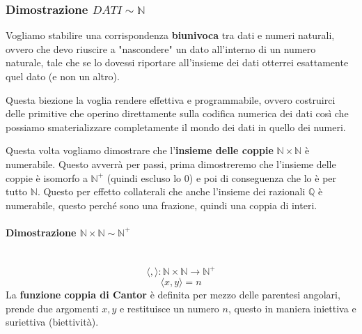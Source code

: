 \documentclass{article}
\begin{document}
\subsubsection{Dimostrazione $DATI\sim\mathbb{N}$}
Vogliamo stabilire una corrispondenza \textbf{biunivoca} tra dati e numeri naturali, ovvero
che devo riuscire a "nascondere" un dato all'interno di un numero naturale, tale che
se lo dovessi riportare all'insieme dei dati otterrei esattamente quel dato (e non un altro).

Questa biezione la voglia rendere effettiva e programmabile, ovvero costruirci delle primitive che
operino direttamente sulla codifica numerica dei dati così che possiamo smaterializzare completamente
il mondo dei dati in quello dei numeri.

Questa volta vogliamo dimostrare che l'\textbf{insieme delle coppie} $\mathbb{N}\times\mathbb{N}$
è numerabile. Questo avverrà per passi, prima dimostreremo che l'insieme delle coppie è isomorfo a
$\mathbb{N}^+$ (quindi escluso lo $0$) e poi di conseguenza che lo è per tutto $\mathbb{N}$.
Questo per effetto collaterali che anche l'insieme dei razionali $\mathbb{Q}$ è numerabile,
questo perché sono una frazione, quindi una coppia di interi.
\paragraph{Dimostrazione $\mathbb{N}\times\mathbb{N}\sim\mathbb{N}^+$}\mbox{}\\
$$\langle ,\rangle :\mathbb{N}\times\mathbb{N}\rightarrow\mathbb{N}^+$$
$$\langle x,y\rangle =n$$
La \textbf{funzione coppia di Cantor} è definita per mezzo delle parentesi
angolari, prende due argomenti $x,y$ e restituisce un numero $n$, questo
in maniera iniettiva e suriettiva (biettività).
\end{document}
